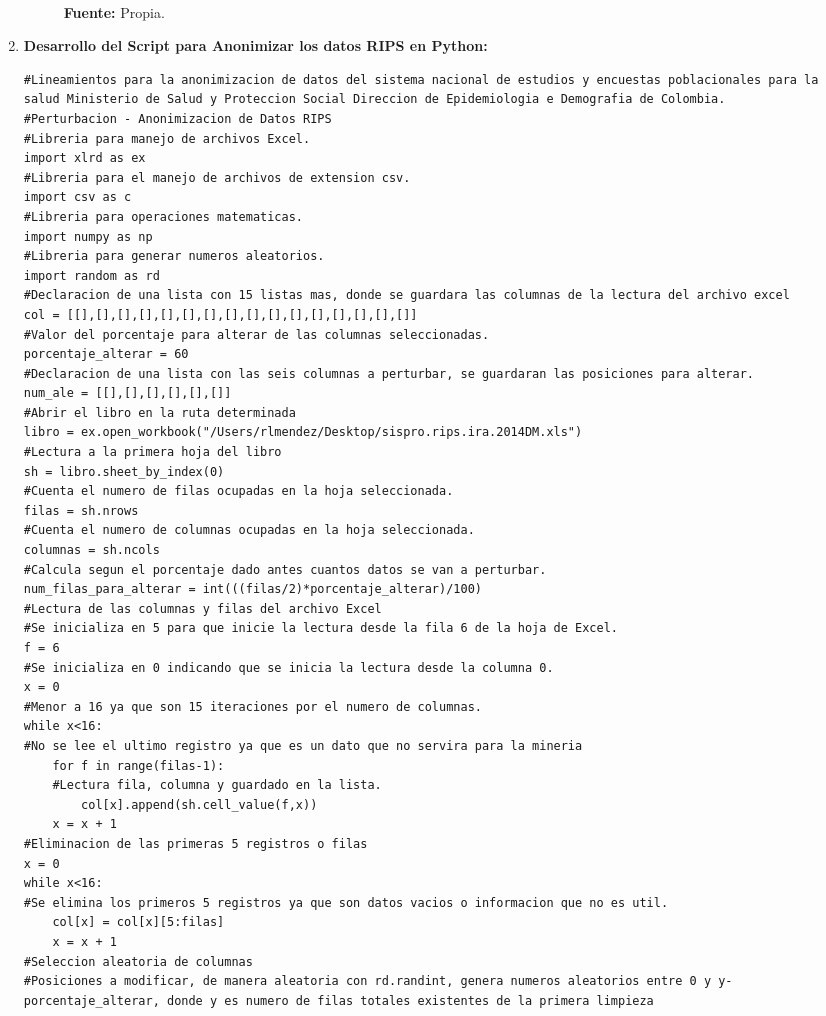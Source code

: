 \documentclass[a4paper,openright,12pt]{book}
\theoremstyle{definition}
\theoremstyle{remark}
\begin{document}
\begin{enumerate}
\begin{figure}[ht]
\label{fig:Datos_Rips}
\\ \textbf{Fuente:} Propia.
\end{figure}
    
    \item \textbf{Desarrollo del Script para Anonimizar los datos RIPS en Python:} 
    \begin{verbatim}
#Lineamientos para la anonimizacion de datos del sistema nacional de estudios y encuestas poblacionales para la salud Ministerio de Salud y Proteccion Social Direccion de Epidemiologia e Demografia de Colombia.
#Perturbacion - Anonimizacion de Datos RIPS
#Libreria para manejo de archivos Excel.
import xlrd as ex
#Libreria para el manejo de archivos de extension csv.
import csv as c
#Libreria para operaciones matematicas.
import numpy as np
#Libreria para generar numeros aleatorios.
import random as rd 
#Declaracion de una lista con 15 listas mas, donde se guardara las columnas de la lectura del archivo excel
col = [[],[],[],[],[],[],[],[],[],[],[],[],[],[],[],[]] 
#Valor del porcentaje para alterar de las columnas seleccionadas.
porcentaje_alterar = 60 
#Declaracion de una lista con las seis columnas a perturbar, se guardaran las posiciones para alterar.
num_ale = [[],[],[],[],[],[]] 
#Abrir el libro en la ruta determinada
libro = ex.open_workbook("/Users/rlmendez/Desktop/sispro.rips.ira.2014DM.xls")
#Lectura a la primera hoja del libro
sh = libro.sheet_by_index(0)
#Cuenta el numero de filas ocupadas en la hoja seleccionada.
filas = sh.nrows
#Cuenta el numero de columnas ocupadas en la hoja seleccionada.
columnas = sh.ncols
#Calcula segun el porcentaje dado antes cuantos datos se van a perturbar.
num_filas_para_alterar = int(((filas/2)*porcentaje_alterar)/100) 
#Lectura de las columnas y filas del archivo Excel
#Se inicializa en 5 para que inicie la lectura desde la fila 6 de la hoja de Excel.
f = 6 
#Se inicializa en 0 indicando que se inicia la lectura desde la columna 0.
x = 0 
#Menor a 16 ya que son 15 iteraciones por el numero de columnas.
while x<16:
#No se lee el ultimo registro ya que es un dato que no servira para la mineria
	for f in range(filas-1): 
    #Lectura fila, columna y guardado en la lista.
		col[x].append(sh.cell_value(f,x))  
	x = x + 1
#Eliminacion de las primeras 5 registros o filas
x = 0 
while x<16:
#Se elimina los primeros 5 registros ya que son datos vacios o informacion que no es util.
	col[x] = col[x][5:filas] 
	x = x + 1
#Seleccion aleatoria de columnas 
#Posiciones a modificar, de manera aleatoria con rd.randint, genera numeros aleatorios entre 0 y y-porcentaje_alterar, donde y es numero de filas totales existentes de la primera limpieza 

\end{verbatim}
\end{enumerate}
\end{document}
